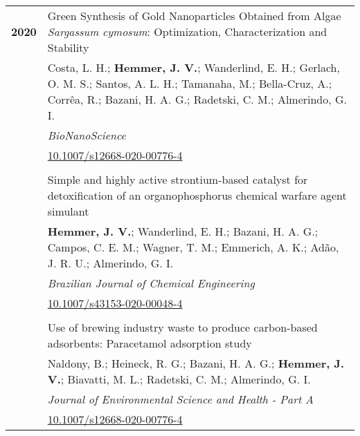 \documentclass[10pt, twoside, table]{article} %
\begin{document}
\begin{tabularx}{\textwidth}{>{\columncolor{lightblue}}p{1.8cm}X}  %
  \centering\textbf{2020} &
  Green Synthesis of Gold Nanoparticles Obtained from Algae \textit{Sargassum cymosum}: Optimization, Characterization and Stability \vspace{0.1cm}\\
  & Costa, L. H.; \textbf{Hemmer, J. V.}; Wanderlind, E. H.;  Gerlach, O. M. S.; Santos, A. L. H.; Tamanaha, M.; Bella-Cruz, A.; Corr\^ea, R.; Bazani, H. A. G.; Radetski, C. M.; Almerindo, G. I. \\  %
  & \textit{BioNanoScience} \\
  & \href{https://link.springer.com/article/10.1007/s12668-020-00776-4}{10.1007/s12668-020-00776-4} \\

  \\

  \centering\textbf{} &
  Simple and highly active strontium-based catalyst for detoxification of an organophosphorus chemical warfare agent simulant \vspace{0.1cm}\\
  & \textbf{Hemmer, J. V.}; Wanderlind, E. H.; Bazani, H. A. G.; Campos, C. E. M.; Wagner, T. M.; Emmerich, A. K.; Ad\~ao, J. R. U.; Almerindo, G. I. \\  %
  & \textit{Brazilian Journal of Chemical Engineering} \\
  & \href{https://link.springer.com/article/10.1007/s43153-020-00048-4}{10.1007/s43153-020-00048-4} \\

  \\

  \centering\textbf{} &
  Use of brewing industry waste to produce carbon-based adsorbents: Paracetamol adsorption study \vspace{0.1cm}\\
  & Naldony, B.; Heineck, R. G.; Bazani, H. A. G.; \textbf{Hemmer, J. V.}; Biavatti, M. L.; Radetski, C. M.; Almerindo, G. I. \\  %
  & \textit{Journal of Environmental Science and Health - Part A} \\
  & \href{https://www.tandfonline.com/doi/abs/10.1080/10934529.2020.1759320}{10.1007/s12668-020-00776-4} \\
\end{tabularx}
\end{document}
